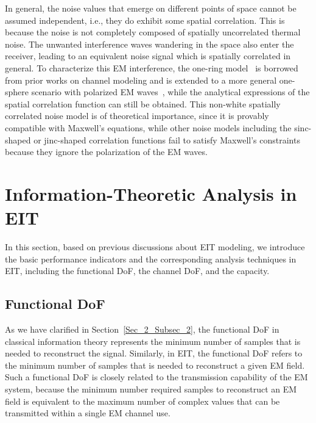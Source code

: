 \documentclass[journal,twocolumn]{IEEEtran}
\begin{document}
In general, the noise values that emerge on different points of space cannot be assumed independent, i.e., they do exhibit some spatial correlation. 
This is because the noise is not completely composed of spatially uncorrelated thermal noise. 
The unwanted interference waves wandering in the space also enter the receiver, leading to an equivalent noise signal which is spatially correlated in general. 
To characterize this EM interference, the one-ring model~\cite{byers2004spatially} is borrowed from prior works on channel modeling and is extended to a more general one-sphere scenario with polarized EM waves~\cite{wan2022mutual}, while the analytical expressions of the spatial correlation function can still be obtained. 
This non-white spatially correlated noise model is of theoretical importance, since it is provably compatible with Maxwell's equations, while other noise models including the sinc-shaped or jinc-shaped correlation functions fail to satisfy Maxwell's constraints because they ignore the polarization of the EM waves. 

\section{Information-Theoretic Analysis in EIT}
In this section, based on previous discussions about EIT modeling, we introduce the basic performance indicators and the corresponding analysis techniques in EIT, including the functional DoF, the channel DoF, and the capacity. 


\subsection{Functional DoF}\label{Sec_4_Subsec_1}
As we have clarified in Section~\ref{Sec_2_Subsec_2}, the functional DoF in classical information theory represents the minimum number of samples that is needed to reconstruct the signal. Similarly, in EIT, the functional DoF refers to the minimum number of samples that is needed to reconstruct a given EM field. 
Such a functional DoF is closely related to the transmission capability of the EM system, because the minimum number required samples to reconstruct an EM field is equivalent to the maximum number of complex values that can be transmitted within a single EM channel use. 
\end{document}

